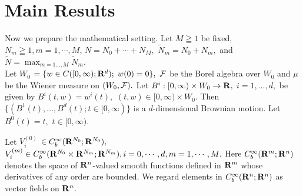 \documentclass[12pt]{article}
\begin{document}
\section{Main Results}
Now we prepare the mathematical setting. 
Let $M \geqq 1$ be fixed, ${N}_{m} \geqq 1, m=1, \cdots, M$, 
$N= N_0+ \cdots + N_M,$ $ \tilde{N}_m=N_0+N_m,$ and $\tilde{N}=\max_{m=1\ldots,M}\tilde{N}_m$.\\
Let $W_0$ $ = \{ w\in C([0,\infty );{\bf R}^d); \; w(0) = 0 \} ,$
${\cal F}$ be the Borel algebra over $W_0$ 
and $\mu$ be the Wiener measure on $(W_0,{\cal F}).$
Let $B^i:[0,\infty )\times W_0 \to {\bf R},$ $i=1,\ldots ,d,$ be given 
by $B^i(t,w) =w^i(t),$ $(t,w)\in [0,\infty )\times W_0.$
Then $ \{ (B^1(t), \dots ,B^d(t) ; t \in [0,\infty ) \}$ 
is a $d$-dimensional Brownian motion.
Let $B^0(t) = t,$ $t \in [0,\infty ).$

\noindent Let $V^{(0)}_i$ $ \in C^{\infty}_b({\bf R}^{{N}_0}; {\bf R}^{{N}_0}),$ 
$V^{(m)}_i \in C^{\infty}_b({\bf R}^{{N}_0}\times {\bf R}^{{N}_m};{\bf R}^{{N}_m}), i =0, \cdots, d, m=1, \cdots, M.$
Here $C^{\infty}_b({\bf R}^m;{\bf R}^n)$ denotes 
the space of ${\bf R}^n$-valued smooth functions defined 
in ${\bf R}^m$ whose derivatives of any order are bounded.
We regard elements in $C^{\infty}_b({\bf R}^n;{\bf R}^n)$ 
as vector fields on ${\bf R}^n.$
\end{document}
